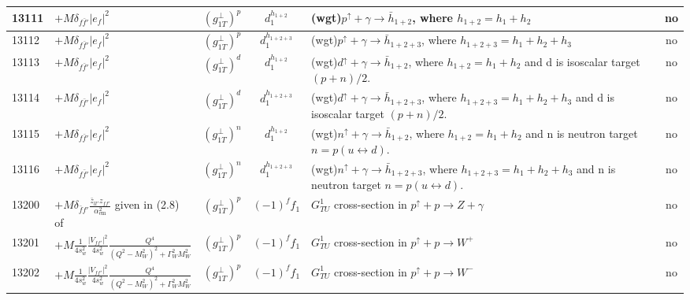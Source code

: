 \documentclass[prd,nofootinbib,eqsecnum,final]{revtex4}
\newcommand{\Ds}{\displaystyle}
\renewcommand{\(}{\left(}
\renewcommand{\)}{\right)}
\renewcommand{\[}{\left[}
\renewcommand{\]}{\right]}
\begin{document}
\begin{center}
\begin{longtable}{||l|p{6cm}|c|c||p{7cm}|c||}
\\\hline
13111 & $+M\delta_{f\bar f'}|e_f|^2$~~&$(g_{1T}^\perp)^{p}$ & $d^{h_{1+2}}_1$ & (wgt)$p^{\uparrow}+\gamma\to \bar h_{1+2}$, where $h_{1+2}=h_1+h_2$ & no
\\\hline
13112 & $+M\delta_{f\bar f'}|e_f|^2$~~&$(g_{1T}^\perp)^{p}$ & $d^{h_{1+2+3}}_1$ & (wgt)$p^{\uparrow}+\gamma\to \bar h_{1+2+3}$, where $h_{1+2+3}=h_1+h_2+h_3$ & no
\\\hline
13113 & $+M\delta_{f\bar f'}|e_f|^2$~~&$(g_{1T}^\perp)^{d}$ & $d^{h_{1+2}}_1$ & (wgt)$d^{\uparrow}+\gamma\to \bar h_{1+2}$, where $h_{1+2}=h_1+h_2$ and d is isoscalar target $(p+n)/2$. & no
\\\hline
13114 & $+M\delta_{f\bar f'}|e_f|^2$~~&$(g_{1T}^\perp)^{d}$ & $d^{h_{1+2+3}}_1$ & (wgt)$d^{\uparrow}+\gamma\to \bar h_{1+2+3}$, where $h_{1+2+3}=h_1+h_2+h_3$ and d is isoscalar target $(p+n)/2$. & no
\\\hline
13115 & $+M\delta_{f\bar f'}|e_f|^2$~~&$(g_{1T}^\perp)^{n}$ & $d^{h_{1+2}}_1$ & (wgt)$n^{\uparrow}+\gamma\to \bar h_{1+2}$, where $h_{1+2}=h_1+h_2$ and n is neutron target $n=p(u\leftrightarrow d)$. & no
\\\hline
13116 & $+M\delta_{f\bar f'}|e_f|^2$~~&$(g_{1T}^\perp)^{n}$ & $d^{h_{1+2+3}}_1$ & (wgt)$n^{\uparrow}+\gamma\to \bar h_{1+2+3}$, where $h_{1+2+3}=h_1+h_2+h_3$ and n is neutron target $n=p(u\leftrightarrow d)$. & no
\\\hline
13200 & $+M\Ds\delta_{\bar f f'}\frac{\bar z_{ll'}z_{ff'}}{\alpha_{\text{em}}^2}$ given in (2.8) of \cite{Scimemi:2017etj} & $(g_{1T}^\perp)^p$ & $(-1)^f f_1$ & $G_{TU}^1$ cross-section in $p^{\uparrow}+p\to Z+\gamma$ & no
\\\hline
13201 & $+M\Ds \frac{1}{4s_w^2}\frac{|V_{f f'}|^2}{4s_w^2}\frac{Q^4}{(Q^2-M_W^2)^2+\Gamma_W^2M_W^2}$ & $(g_{1T}^\perp)^p$ & $(-1)^ff_1$ & $G_{TU}^1$ cross-section in $p^{\uparrow}+p\to W^+$ & no
\\\hline
13202 & $+M\Ds \frac{1}{4s_w^2}\frac{|V_{f f'}|^2}{4s_w^2}\frac{Q^4}{(Q^2-M_W^2)^2+\Gamma_W^2M_W^2}$ & $(g_{1T}^\perp)^p$ & $(-1)^ff_1$ & $G_{TU}^1$ cross-section in $p^{\uparrow}+p\to W^-$ & no
\\\hline\hline
\end{longtable}


\end{center}
\end{document}
